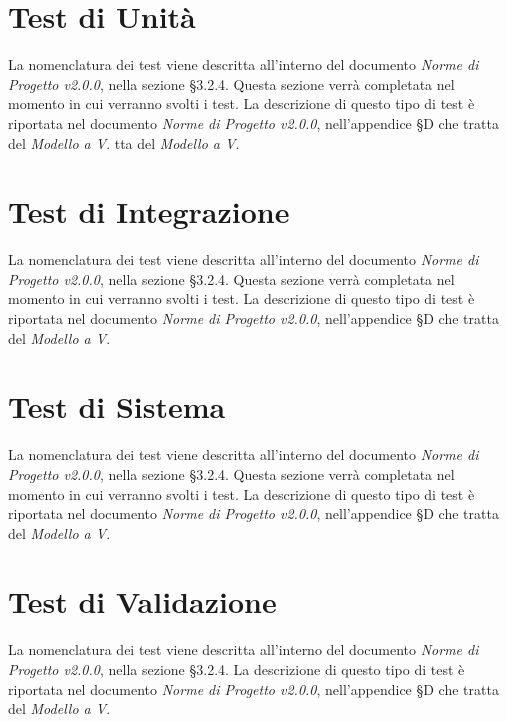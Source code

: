 \section{Test di Unità}
\label{test_u}

La nomenclatura dei test viene descritta all'interno del documento \textit{Norme di Progetto v2.0.0}, nella sezione §3.2.4. Questa sezione verrà completata nel momento in cui verranno svolti i test. La descrizione di questo tipo di test è riportata nel documento \textit{Norme di Progetto v2.0.0}, nell'appendice §D che tratta del \textit{Modello a V}.
tta del \textit{Modello a V}.

\newpage
\section{Test di Integrazione}
\label{test_i}
La nomenclatura dei test viene descritta all'interno del documento \textit{Norme di Progetto v2.0.0}, nella sezione §3.2.4. Questa sezione verrà completata nel momento in cui verranno svolti i test. La descrizione di questo tipo di test è riportata nel documento \textit{Norme di Progetto v2.0.0}, nell'appendice §D che tratta del \textit{Modello a V}.

\newpage
\section{Test di Sistema}
\label{test_s}
La nomenclatura dei test viene descritta all'interno del documento \textit{Norme di Progetto v2.0.0}, nella sezione §3.2.4. Questa sezione verrà completata nel momento in cui verranno svolti i test. La descrizione di questo tipo di test è riportata nel documento \textit{Norme di Progetto v2.0.0}, nell'appendice §D che tratta del \textit{Modello a V}.
\newpage





\section{Test di Validazione}

La nomenclatura dei test viene descritta all'interno del documento \textit{Norme di Progetto v2.0.0}, nella sezione §3.2.4. La descrizione di questo tipo di test è riportata nel documento \textit{Norme di Progetto v2.0.0}, nell'appendice §D che tratta del \textit{Modello a V}.

